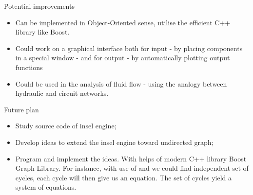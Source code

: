 \documentclass[xcolor=dvipsnames]{beamer}
\begin{document}
\begin{frame}{ Potential improvements}
	\begin{itemize}
		\item Can be implemented in Object-Oriented sense, utilise the efficient C++ library like Boost.
		\item Could work on a graphical interface both for input - by placing components in a special window - and for output - by automatically plotting output functions
		\item Could be used in the analysis of fluid flow - using the analogy between hydraulic and circuit networks.
	\end{itemize}
\end{frame}

\begin{frame}{Future plan}
\begin{itemize}
	\item Study source code of insel engine;
	\item Develop {\color{red}ideas} to extend the insel engine toward undirected graph;
	\item Program and implement the ideas. With helps of modern C++ library Boost Graph Library. For instance, with use of 
\href{https://www.boost.org/doc/libs/1_46_0/boost/graph/tiernan_all_cycles.hpp}{}
and \href{https://www.boost.org/doc/libs/1_46_1/libs/graph/example/tiernan_print_cycles.cpp}{} we could find independent set of cycles, each cycle will then give us an equation. The set of cycles yield a system of equations.
\end{itemize}

\end{frame}



\end{document}
